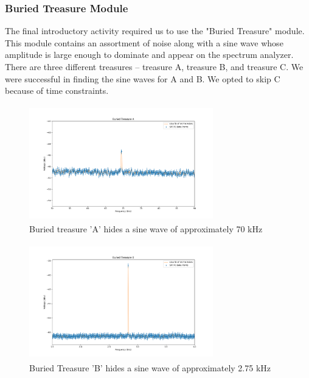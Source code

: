 \documentclass{article}
\begin{document}
\subsubsection{Buried Treasure Module}%
\label{sub:buried_treasure_module}

The final introductory activity required us to use the "Buried Treasure"
module. This module contains an assortment of noise along with a sine wave
whose amplitude is large enough to dominate and appear on the spectrum
analyzer. There are three different treasures -- treasure A, treasure B, and
treasure C. We were successful in finding the sine waves for A and B. We opted
to skip C because of time constraints. 

\begin{figure}[H]
    \centering
\begin{minipage}{11cm}
\begin{tcolorbox}
    \centering
        \includegraphics[width=8cm, height=5cm]{figures/figure16.png}
        \caption{Buried treasure 'A' hides a sine wave of approximately 70 kHz}
        \label{fig:fig16}
\end{tcolorbox}
\end{minipage}
\end{figure}

\begin{figure}[H]
    \centering
\begin{minipage}{11cm}
\begin{tcolorbox}
    \centering
        \includegraphics[width=8cm, height=5cm]{figures/figure17.png}
        \caption{Buried Treasure 'B' hides a sine wave of approximately 2.75 kHz}
        \label{fig:fig17}
\end{tcolorbox}
\end{minipage}
\end{figure}
\end{document}
